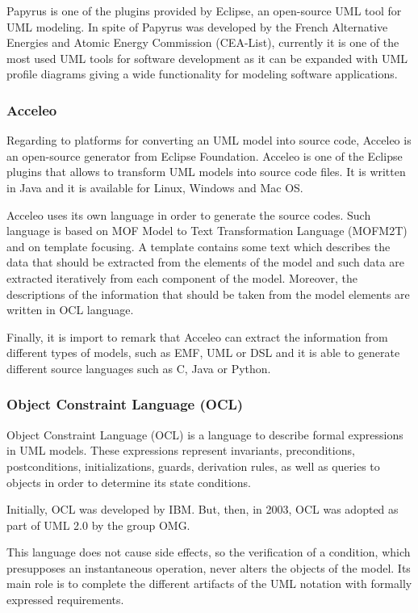 Papyrus is one of the plugins provided by Eclipse, an open-source UML tool for UML modeling. In spite of Papyrus was developed by the French Alternative Energies and Atomic Energy Commission (CEA-List), currently it is one of the most used UML tools for software development as it can be expanded with UML profile diagrams giving a wide functionality for modeling software applications.

\subsubsection*{Acceleo}

Regarding to platforms for converting an UML model into source code, Acceleo is an open-source generator from Eclipse Foundation. Acceleo is
one of the Eclipse plugins that allows to transform UML models into source code files. It is written in Java and it is available for Linux, Windows and Mac OS.

Acceleo uses its own language in order to generate the source codes. Such language is based on MOF Model to Text Transformation Language (MOFM2T) and on template focusing. A template contains some text which describes the data that should be extracted from the elements of the model and such data are extracted iteratively from each component of the model. Moreover, the descriptions of the information that should be taken from the model elements are written in OCL language.

Finally, it is import to remark that Acceleo can extract the information from different types of models, such as EMF, UML or DSL and it is able to generate different source languages such as C, Java or Python.

\subsubsection{Object Constraint Language (OCL)}

Object Constraint Language (OCL) is a language to describe formal expressions in UML models. These expressions represent invariants, preconditions, postconditions, initializations, guards, derivation rules, as well as queries to objects in order to determine its state conditions. 

Initially, OCL was developed by IBM. But, then, in 2003, OCL was adopted as part of UML 2.0 by the group OMG.

This language does not cause side effects, so the verification of a condition, which presupposes an instantaneous operation, never alters the objects of the model. Its main role is to complete the different artifacts of the UML notation with formally expressed requirements.

